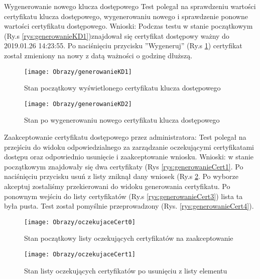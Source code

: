\begin{enumerate*}
	\item Wygenerowanie nowego klucza dostępowego\newline
	Test polegał na sprawdzeniu wartości certyfikatu klucza dostępowego, wygenerowaniu nowego i sprawdzenie ponowne wartości certyfikatu dostępowego.
	Wnioski: Podczas testu w stanie początkowym (Ry.s \ref{rys:generowanieKD1})znajdował się certyfikat dostępowy ważny do 2019.01.26 14:23:55. Po naciśnięciu przycisku ''Wygeneruj''  (Ry.s \ref{rys:generowanieKD2}) certyfikat został zmieniony na nowy z datą ważności o godzinę dłuższą.	
	\begin{figure}[ht!]
		\centering
		\begin{minipage}{0.3\textwidth}
			\texttt{[image: Obrazy/generowanieKD1]}
			\caption{Stan początkowy wyświetlonego certyfikatu klucza dostępowego }
			\label{rys:generowanieKD1}
		\end{minipage}
	\hspace{0.01\textwidth}
		\begin{minipage}{0.3\textwidth}
			\texttt{[image: Obrazy/generowanieKD2]}
			\caption{Stan po wygenerowaniu nowego certyfikatu klucza dostępowego}
			\label{rys:generowanieKD2}
		\end{minipage}
	\end{figure}
	
	\item  Zaakceptowanie certyfikatu dostępowego przez administratora: \newline
	Test polegał na przejściu do widoku odpowiedzialnego za zarządzanie oczekującymi certyfikatami dostępu oraz odpowiednio usunięcie i zaakceptowanie wniosku.
	\newline Wnioski: w stanie początkowym znajdowały się dwa certyfikaty (Rys \ref{rys:generowanieCert1}. Po naciśnięciu przycisku usuń z listy zniknął dany wniosek (Ry.s \ref{rys:generowanieCert2}. Po wyborze akceptuj zostaliśmy przekierowani do widoku generowania certyfikatu. Po ponownym wejściu do listy certyfikatów (Ry.s \ref{rys:generowanieCert3}) lista ta była pusta. Test został pomyślnie przeprowadzony (Rys. \ref{rys:generowanieCert4}). 
		\begin{figure}[ht!]
			\centering
		\begin{minipage}{0.4\textwidth}
			\texttt{[image: Obrazy/oczekujaceCert0]}
			\caption{Stan początkowy listy oczekujących certyfikatów na zaakceptowanie }
			\label{rys:generowanieCert1}
		\end{minipage}
	\hspace{0.01\textwidth}
		\begin{minipage}{0.4\textwidth}
			\texttt{[image: Obrazy/oczekujaceCert1]}
			\caption{Stan listy oczekujących certyfikatów po usunięciu z listy elementu}
			\label{rys:generowanieCert2}
		\end{minipage}
	\end{figure}


\end{enumerate*}
